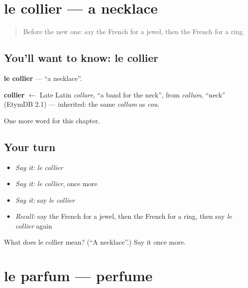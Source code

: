 \section[le collier]{le collier — a necklace}

\label{lesson:FR-C118-collier}



\begin{quote}
Before the new one: say the French for a jewel, then the French for a ring.
\end{quote}

\subsection*{You'll want to know: le collier}
\textbf{le collier} — \textquotedblleft{}a necklace\textquotedblright{}.

\begin{cousinweb}
\textbf{collier} $\leftarrow$ Late Latin \emph{collare}, \textquotedblleft{}a band for the neck\textquotedblright{}, from \emph{collum}, \textquotedblleft{}neck\textquotedblright{} (EtymDB 2.1) — inherited: the same \emph{collum} as \emph{cou}.
\end{cousinweb}

\begin{grammarlens}[title={What you've built}]
One more word for this chapter.
\end{grammarlens}

\subsection*{Your turn}
\begin{itemize}
\raggedright
  \item \emph{Say it:} \emph{le collier}
  \item \emph{Say it:} \emph{le collier}, once more
  \item \emph{Say it:} say \emph{le collier}
  \item \emph{Recall:} say the French for a jewel, then the French for a ring, then say \emph{le collier} again
\end{itemize}

\begin{tcolorbox}[breakable,colback=teal!4,colframe=teal!35!black,title={Before you move on}]
What does le collier mean? (\textquotedblleft{}A necklace\textquotedblright{}.) Say it once more.
\end{tcolorbox}
\section[le parfum]{le parfum — perfume}

